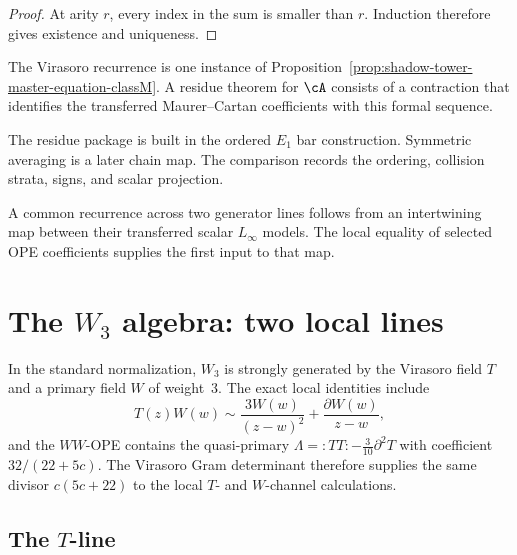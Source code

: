 \begin{proof}
At arity \(r\), every index in the sum is smaller than \(r\).
Induction therefore gives existence and uniqueness.
\end{proof}

\begin{remark}
\label{rem:vir-master-eqn-proof-relation}
The Virasoro recurrence is one instance of
Proposition~\ref{prop:shadow-tower-master-equation-classM}.  A residue
theorem for \(\cA\) consists of a contraction that identifies the
transferred Maurer--Cartan coefficients with this formal sequence.
\end{remark}

\begin{remark}
\label{rem:e1-ordered-provenance}
The residue package is built in the ordered \(E_1\) bar construction.
Symmetric averaging is a later chain map.  The comparison records the
ordering, collision strata, signs, and scalar projection.
\end{remark}

\begin{remark}
\label{rem:line-universality-classM}
A common recurrence across two generator lines follows from an
intertwining map between their transferred scalar \(L_\infty\) models.
The local equality of selected OPE coefficients supplies the first
input to that map.
\end{remark}

\section{The \(W_3\) algebra: two local lines}
\label{sec:w3-two-lines}

In the standard normalization, \(W_3\) is strongly generated by the
Virasoro field \(T\) and a primary field \(W\) of weight~\(3\).  The
exact local identities include
\[
 T(z)W(w)\sim\frac{3W(w)}{(z-w)^2}
 +\frac{\partial W(w)}{z-w},
\]
and the \(WW\)-OPE contains the quasi-primary
\(\Lambda={:}TT{:}-\frac{3}{10}\partial^2T\) with coefficient
\(32/(22+5c)\).  The Virasoro Gram determinant therefore supplies the
same divisor \(c(5c+22)\) to the local \(T\)- and \(W\)-channel
calculations.

\subsection{The \(T\)-line}

